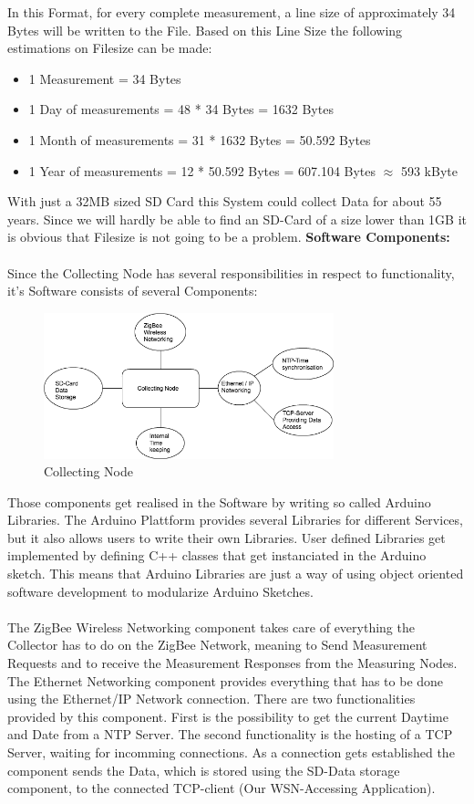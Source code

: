 \documentclass[
	11pt,
	a4paper
]{article}%
\begin{document}
In this Format, for every complete measurement, a line size of approximately 34 Bytes will be written to the File. Based on this Line Size the following estimations on Filesize can be made:
\begin{itemize}
\item 1 Measurement = 34 Bytes
\item 1 Day of measurements = 48 * 34 Bytes = 1632 Bytes
\item 1 Month of measurements = 31 * 1632 Bytes = 50.592 Bytes
\item 1 Year of measurements = 12 * 50.592 Bytes = 607.104 Bytes $\approx$ 593 kByte
\end{itemize}
With just a 32MB sized SD Card this System could collect Data for about 55 years. Since we will hardly be able to find an SD-Card of a size lower than 1GB it is obvious that Filesize is not going to be a problem.
\newpage
\textbf{Software Components:}
\\\\
Since the Collecting Node has several responsibilities in respect to functionality, it's Software consists of several Components:
\begin{figure}[h!]
  \caption{Collecting Node}
  \centering
    \includegraphics[width=0.75\textwidth]{../Images/collector_software_components.png}
\end{figure}
Those components get realised in the Software by writing so called Arduino Libraries. The Arduino Plattform provides several Libraries for different Services, but it also allows users to write their own Libraries. User defined Libraries get implemented by defining C++ classes that get instanciated in the Arduino sketch. This means that Arduino Libraries are just a way of using object oriented software development to modularize Arduino Sketches.
\\\\
The ZigBee Wireless Networking component takes care of everything the Collector has to do on the ZigBee Network, meaning to Send Measurement Requests and to receive the Measurement Responses from the Measuring Nodes. The Ethernet Networking component provides everything that has to be done using the Ethernet/IP Network connection. There are two functionalities provided by this component. First is the possibility to get the current Daytime and Date from a NTP Server. The second functionality is the hosting of a TCP Server, waiting for incomming connections. As a connection gets established the component sends the Data, which is stored using the SD-Data storage component, to the connected TCP-client (Our WSN-Accessing Application).
\end{document}
